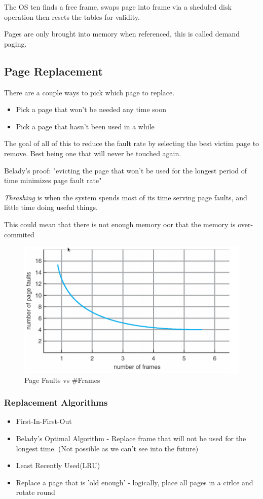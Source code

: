 \documentclass{article}
\begin{document}
The OS ten finds a free frame, swaps page into frame via a sheduled disk operation then resets the tables for validity.

Pages are only brought into memory when referenced, this is called demand paging.

\subsection{Page Replacement}
There are a couple ways to pick which page to replace.
\begin{itemize}
    \item Pick a page that won't be needed any time soon
    \item Pick a page that hasn't been used in a while
\end{itemize}

The goal of all of this to reduce the fault rate by selecting the best victim page to remove.
Best being one that will never be touched again.

Belady's proof:
"evicting the page that won’t be used for the longest period of time minimizes page fault rate"

\emph{Thrashing} is when the system spends most of its time serving page faults, and little time doing useful things.

This could mean that there is not enough memory oor that the memory is over-commited


\begin{figure}[H]
  \centering
  \includegraphics[scale=0.35]{pageFaultGraph.png}
  \caption{Page Faults vs \#Frames}
\end{figure}

\subsubsection{Replacement Algorithms}
\begin{itemize}
    \item First-In-First-Out
    \item Belady's Optimal Algorithm - Replace frame that will not be used for the longest time.
        (Not possible as we can't see into the future)
    \item Least Recently Used(LRU)
    \item Replace a page that is 'old enough' - logically, place all pages in a cirlce and rotate round

\end{itemize}
\end{document}
